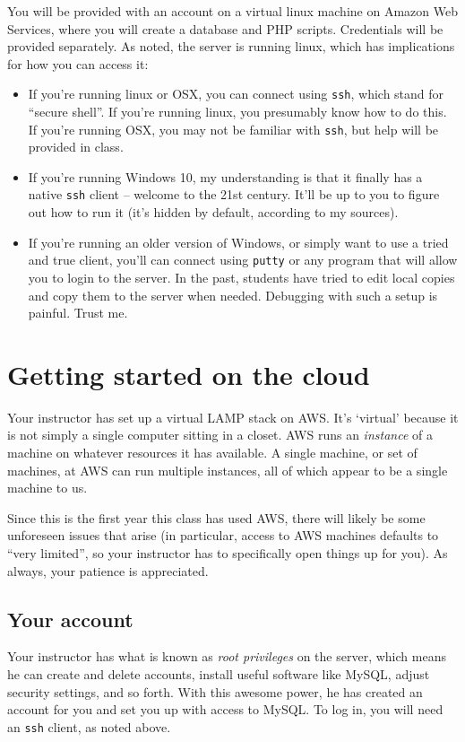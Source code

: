 \documentclass[11pt]{article} %
\begin{document}
You will be provided with an account on a virtual linux machine on Amazon Web Services, where you will create a database and PHP scripts. Credentials will be provided separately. As noted, the server is running linux, which has implications for how you can access it:
\begin{itemize}
\item If you're running linux or OSX, you can connect using \verb|ssh|, which stand for “secure shell”. If you're running linux, you presumably know how to do this. If you’re running OSX, you may not be familiar with \verb|ssh|, but help will be provided in class.
\item If you're running Windows 10, my understanding is that it finally has a native \verb|ssh| client -- welcome to the 21st century. It’ll be up to you to figure out how to run it (it’s hidden by default, according to my sources).
\item If you’re running an older version of Windows, or simply want to use a tried and true client, you'll can connect using \verb|putty| or any program that will allow you to login to the server. In the past, students have tried to edit local copies and copy them to the server when needed. Debugging with such a setup is painful. Trust me. 
\end{itemize}

\section{Getting started on the cloud}

Your instructor has set up a virtual LAMP stack on AWS. It’s ‘virtual’ because it is not simply a single computer sitting in a closet. AWS runs an \emph{instance} of a machine on whatever resources it has available. A single machine, or set of machines, at AWS can run multiple instances, all of which appear to be a single machine to us.

Since this is the first year this class has used AWS, there will likely be some unforeseen issues that arise (in particular, access to AWS machines defaults to “very limited”, so your instructor has to specifically open things up for you). As always, your patience is appreciated.

\subsection*{Your account}

Your instructor has what is known as \emph{root privileges} on the server, which means he can create and delete accounts, install useful software like MySQL, adjust security settings, and so forth. With this awesome power, he has created an account for you and set you up with access to MySQL. To log in, you will need an \verb|ssh| client, as noted above.
\end{document}
